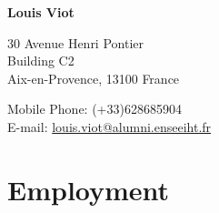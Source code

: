 \documentclass{article}
\begin{document}
{\huge \bf Louis Viot}\\
\bigskip
\begin{minipage}[t]{0.5\textwidth}
	30 Avenue Henri Pontier \\
    Building C2 \\
    Aix-en-Provence, 13100 France
\end{minipage}
\begin{minipage}[]{0.5\textwidth}
\begin{flushright}
	Mobile Phone: (+33)628685904 \\
	E-mail: \href{mailto:louis.viot@alumni.enseeiht.fr}{louis.viot@alumni.enseeiht.fr} \\
\end{flushright}
\end{minipage}

\section*{Employment}
\end{document}
